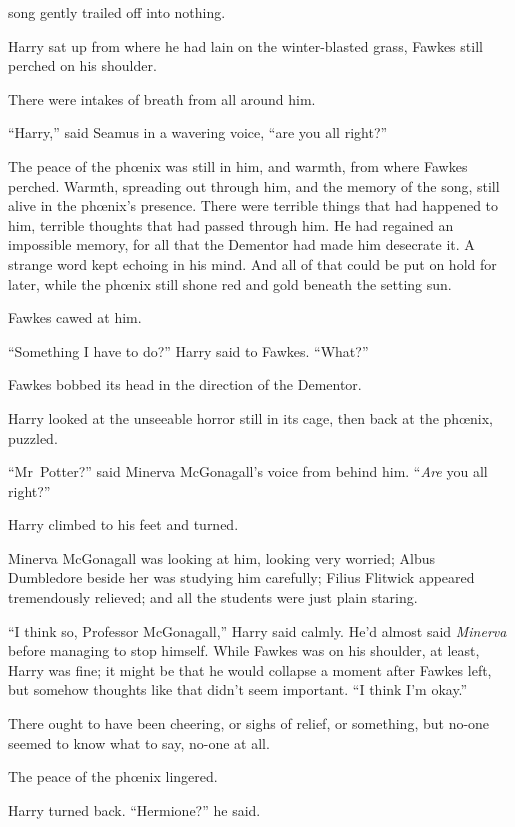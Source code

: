 
 song gently trailed off into nothing.

\hplettrineextrapara
Harry sat up from where he had lain on the winter-blasted grass, Fawkes still perched on his shoulder.

There were intakes of breath from all around him.

“Harry,” said Seamus in a wavering voice, “are you all right?”

The peace of the phœnix was still in him, and warmth, from where Fawkes perched. Warmth, spreading out through him, and the memory of the song, still alive in the phœnix’s presence. There were terrible things that had happened to him, terrible thoughts that had passed through him. He had regained an impossible memory, for all that the Dementor had made him desecrate it. A strange word kept echoing in his mind. And all of that could be put on hold for later, while the phœnix still shone red and gold beneath the setting sun.

Fawkes cawed at him.

“Something I have to do?” Harry said to Fawkes. “What?”

Fawkes bobbed its head in the direction of the Dementor.

Harry looked at the unseeable horror still in its cage, then back at the phœnix, puzzled.

“Mr~Potter?” said Minerva McGonagall’s voice from behind him. “\emph{Are} you all right?”

Harry climbed to his feet and turned.

Minerva McGonagall was looking at him, looking very worried; Albus Dumbledore beside her was studying him carefully; Filius Flitwick appeared tremendously relieved; and all the students were just plain staring.

“I think so, Professor McGonagall,” Harry said calmly. He’d almost said \emph{Minerva} before managing to stop himself. While Fawkes was on his shoulder, at least, Harry was fine; it might be that he would collapse a moment after Fawkes left, but somehow thoughts like that didn’t seem important. “I think I’m okay.”

There ought to have been cheering, or sighs of relief, or something, but no-one seemed to know what to say, no-one at all.

The peace of the phœnix lingered.

Harry turned back. “Hermione?” he said.

